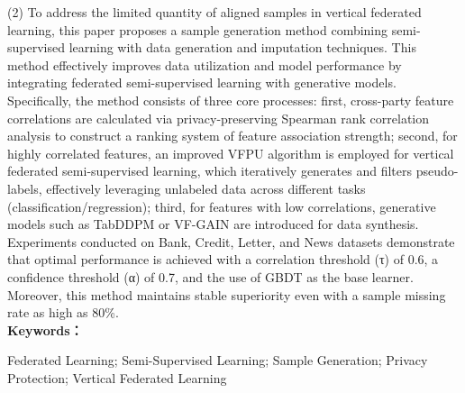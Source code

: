 (2) To address the limited quantity of aligned samples in vertical federated learning, this paper proposes a sample generation method combining semi-supervised learning with data generation and imputation techniques. This method effectively improves data utilization and model performance by integrating federated semi-supervised learning with generative models. Specifically, the method consists of three core processes: first, cross-party feature correlations are calculated via privacy-preserving Spearman rank correlation analysis to construct a ranking system of feature association strength; second, for highly correlated features, an improved VFPU algorithm is employed for vertical federated semi-supervised learning, which iteratively generates and filters pseudo-labels, effectively leveraging unlabeled data across different tasks (classification/regression); third, for features with low correlations, generative models such as TabDDPM or VF-GAIN are introduced for data synthesis. Experiments conducted on Bank, Credit, Letter, and News datasets demonstrate that optimal performance is achieved with a correlation threshold (τ) of 0.6, a confidence threshold (α) of 0.7, and the use of GBDT as the base learner. Moreover, this method maintains stable superiority even with a sample missing rate as high as 80\%.
\\


\noindent\textbf{Keywords：} 
\begin{minipage}[t]{0.85\linewidth}
	Federated Learning; Semi-Supervised Learning; Sample Generation; Privacy Protection; Vertical Federated Learning
\end{minipage}

\clearpage